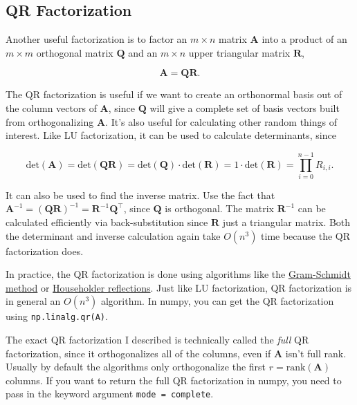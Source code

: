 \documentclass[
  letterpaper,
  DIV=11,
  numbers=noendperiod]{scrreprt}
\begin{document}
\hypertarget{qr-factorization}{%
\subsection{QR Factorization}\label{qr-factorization}}

Another useful factorization is to factor an \(m \times n\) matrix
\(\mathbf{A}\) into a product of an \(m \times m\) orthogonal matrix
\(\mathbf{Q}\) and an \(m \times n\) upper triangular matrix
\(\mathbf{R}\),

\[\mathbf{A} = \mathbf{QR}.\]

The QR factorization is useful if we want to create an orthonormal basis
out of the column vectors of \(\mathbf{A}\), since \(\mathbf{Q}\) will
give a complete set of basis vectors built from orthogonalizing
\(\mathbf{A}\). It's also useful for calculating other random things of
interest. Like LU factorization, it can be used to calculate
determinants, since

\[\text{det}(\mathbf{A}) = \text{det}(\mathbf{QR}) = \text{det}(\mathbf{Q}) \cdot \text{det}(\mathbf{R}) = 1 \cdot \text{det}(\mathbf{R}) = \prod_{i=0}^{n-1} R_{i,i}.\]

It can also be used to find the inverse matrix. Use the fact that
\(\mathbf{A}^{-1} = (\mathbf{QR})^{-1} = \mathbf{R}^{-1} \mathbf{Q}^\top\),
since \(\mathbf{Q}\) is orthogonal. The matrix \(\mathbf{R}^{-1}\) can
be calculated efficiently via back-substitution since \(\mathbf{R}\)
just a triangular matrix. Both the determinant and inverse calculation
again take \(O(n^3)\) time because the QR factorization does.

In practice, the QR factorization is done using algorithms like the
\href{https://en.wikipedia.org/wiki/Gram\%E2\%80\%93Schmidt_process}{Gram-Schmidt
method} or
\href{https://en.wikipedia.org/wiki/Householder_reflection}{Householder
reflections}. Just like LU factorization, QR factorization is in general
an \(O(n^3)\) algorithm. In numpy, you can get the QR factorization
using \texttt{np.linalg.qr(A)}.

The exact QR factorization I described is technically called the
\emph{full} QR factorization, since it orthogonalizes all of the
columns, even if \(\mathbf{A}\) isn't full rank. Usually by default the
algorithms only orthogonalize the first \(r=\text{rank}(\mathbf{A})\)
columns. If you want to return the full QR factorization in numpy, you
need to pass in the keyword argument
\texttt{mode\ =\ \textquotesingle{}complete\textquotesingle{}}.
\end{document}
